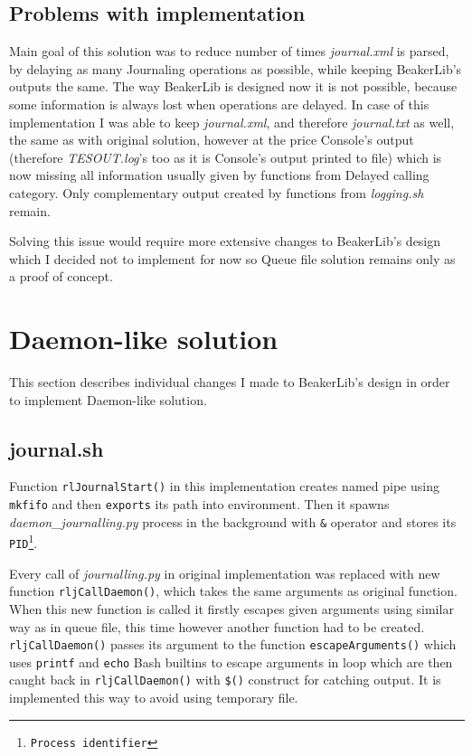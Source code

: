 \subsection{Problems with implementation}
Main goal of this solution was to reduce number of times \textit{journal.xml} is parsed, by delaying as many Journaling operations as possible, while keeping BeakerLib's outputs the same. The way BeakerLib is designed now it is not possible, because some information is always lost when operations are delayed. In case of this implementation I was able to keep \textit{journal.xml}, and therefore \textit{journal.txt}  as well, the same as with original solution, however at the price Console's output (therefore \textit{TESOUT.log}'s too as it is Console's output printed to file) which is now missing all information usually given by functions from Delayed calling category. Only complementary output created by functions from \textit{logging.sh} remain.

Solving this issue would require more extensive changes to BeakerLib's design which I decided not to implement for now so Queue file solution remains only as a proof of concept.

\section{Daemon-like solution}
This section describes individual changes I made to BeakerLib's design in order to implement Daemon-like solution.

\subsection{journal.sh}
Function \texttt{rlJournalStart()} in this implementation creates named pipe using \texttt{mkfifo} and then \texttt{exports} its path into environment.
Then it spawns \textit{daemon\_journalling.py} process in the background with \texttt{\&} operator and stores its \texttt{PID\footnote{Process identifier}}.

Every call of \textit{journalling.py} in original implementation was replaced with new function \texttt{rljCallDaemon()}, which takes the same arguments as original function. When this new function is called it firstly escapes given arguments using similar way as in queue file, this time however another function had to be created.  \texttt{rljCallDaemon()} passes its argument to the function \texttt{escapeArguments()} which uses \texttt{printf} and \texttt{echo} Bash builtins to escape arguments in loop which are then caught back in \texttt{rljCallDaemon()} with \texttt{\$()} construct\cite{command_substitution} for catching output. It is implemented this way to avoid using temporary file.

